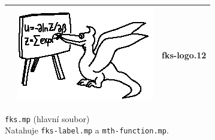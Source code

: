 \documentclass[a4paper,10pt]{article}
\begin{document}
\begin{tabularx}{\textwidth}{|l|l|X|}
    &\includegraphics{fks-logo_12}& fks-logo.12\\\hline
\end{tabularx}\bigskip

{\centering\large\texttt{fks.mp} (hlavní soubor)\nopagebreak\\\medskip}
Natahuje {\tt fks-label.mp} a {\tt mth-function.mp}.\nopagebreak\\
\end{document}
